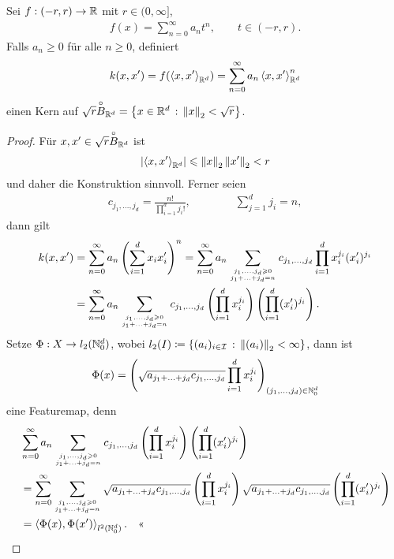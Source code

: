 \begin{lem}
\label{prop:5.1.7}
Sei $f: (-r,r)\to \mathbb{R}$
mit $r\in (0,\infty]$,
\begin{align*}
f(x) = \sum_{n=0}^\infty a_n t^n,\qquad t\in (-r,r).
\end{align*}
Falls $a_n\ge 0$ für alle $n\ge 0$, definiert
\begin{align*}
k(x,x') = f(\left\langle x,x'\right\rangle_{\mathbb{R}^d}) = \sum_{n=0}^\infty a_n \left\langle x,x'\right\rangle_{\mathbb{R}^d}^n
\end{align*}
einen Kern auf $\sqrt{r}\overset{\circ}{B}_{\mathbb{R}^d}=\left\{ x\in\mathbb{R}^d\,:\,\left\|x\right\|_2 <
\sqrt{r}\right\}$.\fishhere
\end{lem}
\begin{proof}
Für $x,x'\in \sqrt{r}\overset{\circ}{B}_{\mathbb{R}^d}$ ist
\begin{align*}
\left|\left\langle x,x'\right\rangle_{\mathbb{R}^d}\right| \leqslant \left\|x\right\|_2\left\|x'\right\|_2 < r
\end{align*}
und daher die Konstruktion sinnvoll. Ferner seien
\begin{align*}
c_{j_1,\ldots,j_d} =
\frac{n!}{\prod_{i=1}^d j_i!},\qquad\qquad 
\sum_{j=1}^d j_i = n,
\end{align*}
dann gilt
\begin{align*}
k(x,x') &= \sum_{n=0}^\infty a_n \left( \sum_{i=1}^d x_i x_i'\right)^n
=
\sum_{n=0}^\infty a_n \sum_{\atop{j_1,\ldots,j_d\ge 0}{j_1+\ldots+j_d =n}}
c_{j_1,\ldots,j_d} \prod_{i=1}^d x_i^{j_i}(x_i')^{j_i}\\
&=
\sum_{n=0}^\infty a_n \sum_{\atop{j_1,\ldots,j_d\ge 0}{j_1+\ldots+j_d =n}}
c_{j_1,\ldots,j_d} \left(\prod_{i=1}^d x_i^{j_i}\right)\left(\prod_{i=1}^d
(x_i')^{j_i}\right).
\end{align*}
Setze $\Phi: X\to l_2(\mathbb{N}_0^d)$, wobei $l_2(I)\coloneq
\left\{ (a_i)_{i\in\mathcal{I}}\,:\,\left\|(a_i)\right\|_2 < \infty\right\}$, dann ist
\begin{align*}
\Phi(x) = \left(\sqrt{a_{j_1+\ldots+j_d}c_{j_1,\ldots,j_d}}\prod_{i=1}^d
x_i^{j_i} \right)_{(j_1,\ldots,j_d)\in\mathbb{N}_0^d}
\end{align*}
eine Featuremap, denn
\begin{align*}
&\sum_{n=0}^\infty a_n \sum_{\atop{j_1,\ldots,j_d\ge 0}{j_1+\ldots+j_d =n}}
c_{j_1,\ldots,j_d} \left(\prod_{i=1}^d x_i^{j_i}\right)\left(\prod_{i=1}^d
(x_i')^{j_i}\right)\\
&=
\sum_{n=0}^\infty \sum_{\atop{j_1,\ldots,j_d\ge 0}{j_1+\ldots+j_d =n}}
\sqrt{a_{j_1+\ldots+j_d}c_{j_1,\ldots,j_d}}\left(\prod_{i=1}^d x_i^{j_i}\right)
\sqrt{a_{j_1+\ldots+j_d}c_{j_1,\ldots,j_d}}\left(\prod_{i=1}^d
(x_i')^{j_i}\right)\\
&= \lin{\Phi(x),\Phi(x')}_{l^2(\N_0^d)}.\qedhere
\end{align*}
\end{proof}


